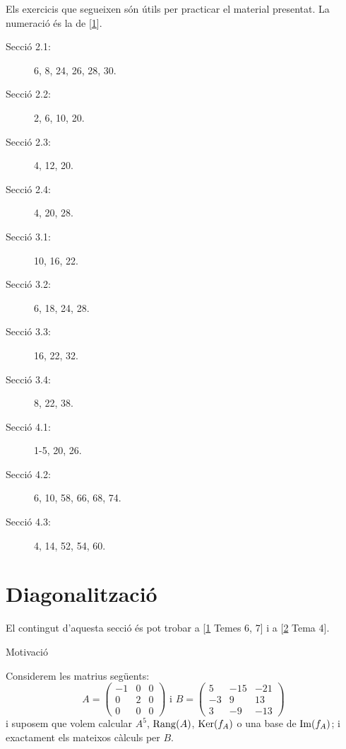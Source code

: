 \documentclass[
  11pt,
]{book}
\makeatletter
\numberwithin{dummy}{section}
\theoremstyle{maincolornumbox}
\theoremstyle{blacknumex}
\theoremstyle{blacknumbox}
\theoremstyle{maincolornum}
\renewcommand{\section}{\@startsection{section}{1}{\z@}
{-4ex \@plus -1ex \@minus -.4ex}
{1ex \@plus.2ex }
{\normalfont\large\sffamily\bfseries}}
\makeatother
\begin{document}
Els exercicis que segueixen són útils per practicar el material
presentat. La numeració és la de {[}\protect\hyperlink{ref-Bret}{1}{]}.

\begin{description}
\item[Secció 2.1:]
6, 8, 24, 26, 28, 30.
\item[Secció 2.2:]
2, 6, 10, 20.
\item[Secció 2.3:]
4, 12, 20.
\item[Secció 2.4:]
4, 20, 28.
\item[Secció 3.1:]
10, 16, 22.
\item[Secció 3.2:]
6, 18, 24, 28.
\item[Secció 3.3:]
16, 22, 32.
\item[Secció 3.4:]
8, 22, 38.
\item[Secció 4.1:]
1-5, 20, 26.
\item[Secció 4.2:]
6, 10, 58, 66, 68, 74.
\item[Secció 4.3:]
4, 14, 52, 54, 60.
\end{description}

\hypertarget{diagonalitzaciuxf3}{%
\chapter{Diagonalització}\label{diagonalitzaciuxf3}}

El contingut d'aquesta secció és pot trobar a {[}\protect\hyperlink{ref-Bret}{1} Temes 6, 7{]} i a
{[}\protect\hyperlink{ref-NaXa}{2} Tema 4{]}.

\hypertarget{subsec:motiv-diag}{%
\section{Motivació}\label{subsec:motiv-diag}}

Considerem les matrius següents: \[A=\begin{pmatrix}
-1 & 0 & 0 \\ 0 & 2 & 0 \\ 0 & 0 & 0
\end{pmatrix}
\text{ i }
B=\begin{pmatrix}
5 & -15 & -21 \\ -3 & 9 & 13 \\ 3 & -9 & -13
\end{pmatrix}\] i suposem que volem calcular \(A^5\), \(\operatorname{Rang}(A)\),
\(\operatorname{Ker}(f_A)\) o una base de \(\operatorname{Im}(f_A)\); i exactament els mateixos càlculs
per \(B\).
\end{document}
